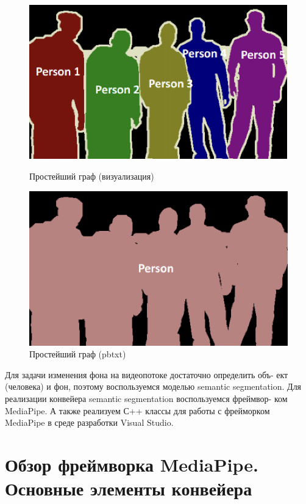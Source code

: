 \documentclass[a4paper,14pt]{extreport}
\begin{document}
    \begin{figure}[h]
        \begin{center}
            \begin{minipage}[h]{0.3\linewidth}
                \includegraphics[width=0.5\linewidth]{images-task/instance.png}
                \caption{Простейший граф (визуализация)}
                \label{ris:instance}
            \end{minipage}
            \hfill
            \begin{minipage}[h]{0.5\linewidth}
                \includegraphics[width=0.7\linewidth]{images-task/semantic.png}
                \caption{Простейший граф (pbtxt)}
                \label{ris:semantic}
            \end{minipage}
        \end{center}
    \end{figure}

    Для задачи изменения фона на видеопотоке достаточно определить объ- ект (человека) и фон, поэтому воспользуемся моделью semantic segmentation. Для реализации конвейера semantic segmentation воспользуемся фреймвор- ком MediaPipe. А также реализуем С++ классы для работы с фрейморком MediaPipe в среде разработки Visual Studio.

    \chapter{Обзор фреймворка MediaPipe. Основные элементы конвейера}
\end{document}
